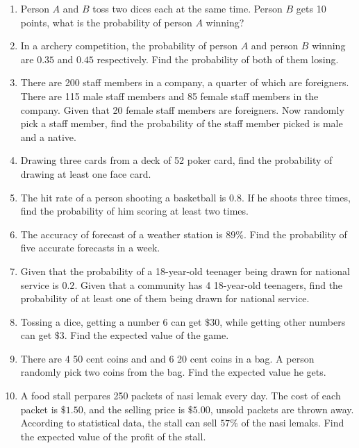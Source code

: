 \documentclass{report}
\begin{document}
\begin{multicols}{2}
\begin{enumerate}
    \item Person $A$ and $B$ toss two dices each at the same time. Person $B$ gets 10
          points, what is the probability of person $A$ winning?

    \item In a archery competition, the probability of person $A$ and person $B$ winning
          are $0.35$ and $0.45$ respectively. Find the probability of both of them
          losing.

    \item There are 200 staff members in a company, a quarter of which are foreigners.
          There are 115 male staff members and 85 female staff members in the company.
          Given that 20 female staff members are foreigners. Now randomly pick a staff
          member, find the probability of the staff member picked is male and a native.

    \item Drawing three cards from a deck of 52 poker card, find the probability of
          drawing at least one face card.

    \item The hit rate of a person shooting a basketball is $0.8$. If he shoots three
          times, find the probability of him scoring at least two times.

    \item The accuracy of forecast of a weather station is $89\%$. Find the probability
          of five accurate forecasts in a week.

    \item Given that the probability of a 18-year-old teenager being drawn for national
          service is $0.2$. Given that a community has 4 18-year-old teenagers, find the
          probability of at least one of them being drawn for national service.

    \item Tossing a dice, getting a number 6 can get $\$30$, while getting other numbers
          can get $\$3$. Find the expected value of the game.

    \item There are 4 50 cent coins and and 6 20 cent coins in a bag. A person randomly
          pick two coins from the bag. Find the expected value he gets.

    \item A food stall perpares 250 packets of nasi lemak every day. The cost of each
          packet is $\$1.50$, and the selling price is $\$5.00$, unsold packets are
          thrown away. According to statistical data, the stall can sell $57\%$ of the
          nasi lemaks. Find the expected value of the profit of the stall.


\end{enumerate}
\end{multicols}
\end{document}
